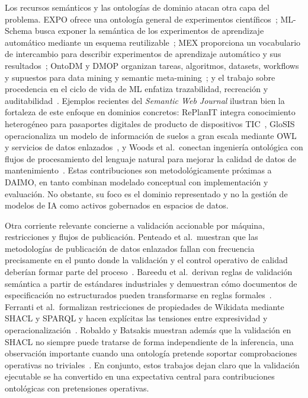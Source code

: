 \documentclass[11pt,a4paper]{article}
\begin{document}
Los recursos semánticos y las ontologías de dominio atacan otra capa del problema. EXPO ofrece una ontología general de experimentos científicos~\cite{expo}; ML-Schema busca exponer la semántica de los experimentos de aprendizaje automático mediante un esquema reutilizable~\cite{mls}; MEX proporciona un vocabulario de intercambio para describir experimentos de aprendizaje automático y sus resultados~\cite{mex}; OntoDM y DMOP organizan tareas, algoritmos, datasets, workflows y supuestos para data mining y semantic meta-mining~\cite{ontodm,dmop}; y el trabajo sobre procedencia en el ciclo de vida de ML enfatiza trazabilidad, recreación y auditabilidad~\cite{souza19}. Ejemplos recientes del \emph{Semantic Web Journal} ilustran bien la fortaleza de este enfoque en dominios concretos: RePlanIT integra conocimiento heterogéneo para pasaportes digitales de producto de dispositivos TIC~\cite{kurteva}, GloSIS operacionaliza un modelo de información de suelos a gran escala mediante OWL y servicios de datos enlazados~\cite{palma}, y Woods et al.\ conectan ingeniería ontológica con flujos de procesamiento del lenguaje natural para mejorar la calidad de datos de mantenimiento~\cite{woods}. Estas contribuciones son metodológicamente próximas a DAIMO, en tanto combinan modelado conceptual con implementación y evaluación. No obstante, su foco es el dominio representado y no la gestión de modelos de IA como activos gobernados en espacios de datos.

Otra corriente relevante concierne a validación accionable por máquina, restricciones y flujos de publicación. Penteado et al.\ muestran que las metodologías de publicación de datos enlazados fallan con frecuencia precisamente en el punto donde la validación y el control operativo de calidad deberían formar parte del proceso~\cite{penteado23}. Bareedu et al.\ derivan reglas de validación semántica a partir de estándares industriales y demuestran cómo documentos de especificación no estructurados pueden transformarse en reglas formales~\cite{bareedu24}. Ferranti et al.\ formalizan restricciones de propiedades de Wikidata mediante SHACL y SPARQL y hacen explícitas las tensiones entre expresividad y operacionalización~\cite{ferranti}. Robaldo y Batsakis muestran además que la validación en SHACL no siempre puede tratarse de forma independiente de la inferencia, una observación importante cuando una ontología pretende soportar comprobaciones operativas no triviales~\cite{robaldo}. En conjunto, estos trabajos dejan claro que la validación ejecutable se ha convertido en una expectativa central para contribuciones ontológicas con pretensiones operativas.
\end{document}
